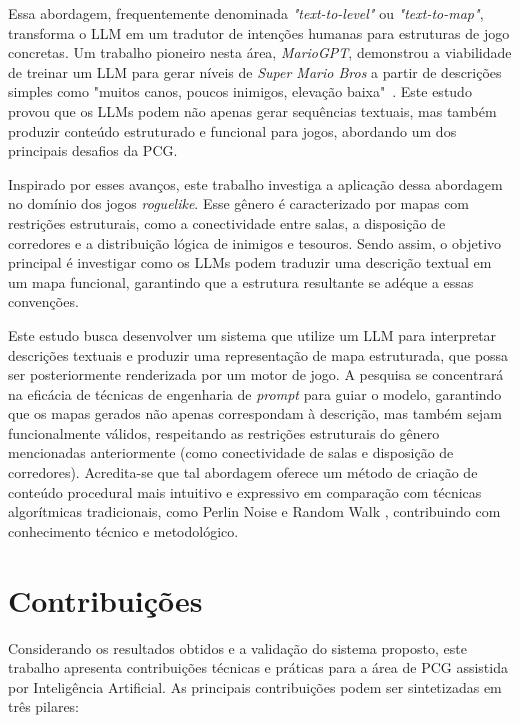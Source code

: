 Essa abordagem, frequentemente denominada \textit{"text-to-level"} ou
\textit{"text-to-map"}, transforma o \gls{LLM} em um tradutor de intenções
humanas para estruturas de jogo concretas. Um trabalho pioneiro nesta área,
\textit{MarioGPT}, demonstrou a viabilidade de treinar um \gls{LLM} para gerar
níveis de \textit{Super Mario Bros} a partir de descrições simples como "muitos
canos, poucos inimigos, elevação baixa"\ \cite{sudhakaran2023mariogpt}. Este
estudo provou que os \gls{LLM}s podem não apenas gerar sequências textuais, mas
também produzir conteúdo estruturado e funcional para jogos, abordando um dos
principais desafios da \gls{PCG}.

Inspirado por esses avanços, este trabalho investiga a aplicação dessa abordagem
no domínio dos jogos \textit{roguelike}. Esse gênero é caracterizado por mapas
com restrições estruturais, como a conectividade entre salas, a disposição de
corredores e a distribuição lógica de inimigos e tesouros. Sendo assim, o
objetivo principal é investigar como os LLMs podem traduzir uma descrição
textual em um mapa funcional, garantindo que a estrutura resultante se adéque a
essas convenções.

Este estudo busca desenvolver um sistema que utilize um \gls{LLM} para
interpretar descrições textuais e produzir uma representação de mapa
estruturada, que possa ser posteriormente renderizada por um motor de jogo. A
pesquisa se concentrará na eficácia de técnicas de engenharia de \textit{prompt}
para guiar o modelo, garantindo que os mapas gerados não apenas correspondam à
descrição, mas também sejam funcionalmente válidos, respeitando as restrições
estruturais do gênero mencionadas anteriormente (como conectividade de salas e
disposição de corredores).  Acredita-se que tal abordagem oferece um método de
criação de conteúdo procedural mais intuitivo e expressivo em comparação com
técnicas algorítmicas tradicionais, como Perlin Noise \cite{perlin1985image} e
Random Walk \cite{pearson1905problem}, contribuindo com conhecimento técnico e
metodológico.

\section{Contribuições}
\label{sec:contribuicoes}

Considerando os resultados obtidos e a validação do sistema proposto, este
trabalho apresenta contribuições técnicas e práticas para a área de \gls{PCG}
assistida por Inteligência Artificial. As principais contribuições podem ser
sintetizadas em três pilares:

